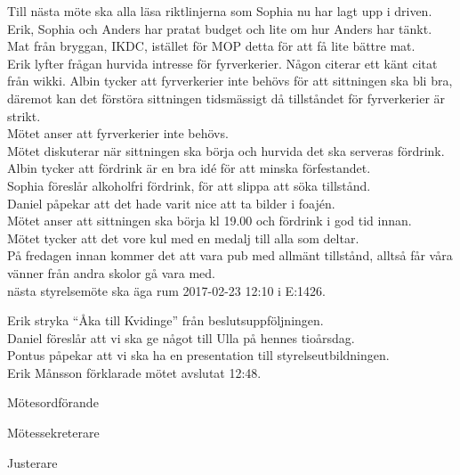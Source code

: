 \documentclass[10pt]{article}
\def\mo{Erik Månsson}
\def\ms{Johan Karlberg}
\def\ji{Markus Rahne}
\begin{document}
\begin{paragrafer}
Till nästa möte ska alla läsa riktlinjerna som Sophia nu har lagt upp i driven.
Erik, Sophia och Anders har pratat budget och lite om hur Anders har tänkt. Mat från bryggan, IKDC, istället för MOP detta för att få lite bättre mat.\\
Erik lyfter frågan hurvida intresse för fyrverkerier. Någon citerar ett känt citat från wikki. Albin tycker att fyrverkerier inte behövs för att sittningen ska bli bra, däremot kan det förstöra sittningen tidsmässigt då tillståndet för fyrverkerier är strikt.\\
Mötet anser att fyrverkerier inte behövs.\\
Mötet diskuterar när sittningen ska börja och hurvida det ska serveras fördrink.
Albin tycker att fördrink är en bra idé för att minska förfestandet.\\
Sophia föreslår alkoholfri fördrink, för att slippa att söka tillstånd.\\
Daniel påpekar att det hade varit nice att ta bilder i foajén.\\
Mötet anser att sittningen ska börja kl 19.00 och fördrink i god tid innan.\\
Mötet tycker att det vore kul med en medalj till alla som deltar.\\
På fredagen innan kommer det att vara pub med allmänt tillstånd, alltså får våra vänner från andra skolor gå vara med.\\
{\Mba}nästa styrelsemöte ska äga rum 2017-02-23 12:10 i E:1426.

Erik \ypa stryka ``Åka till Kvidinge'' från beslutsuppföljningen.\\
\Mbaby
{}
Daniel föreslår att vi ska ge något till Ulla på hennes tioårsdag.\\
Pontus påpekar att vi ska ha en presentation till styrelseutbildningen.\\
{\mo} förklarade mötet avslutat 12:48.

\end{paragrafer}

\newpage
\hidesignfoot
\begin{signatures}{3}
\signature{\mo}{Mötesordförande}
\signature{\ms}{Mötessekreterare}
\signature{\ji}{Justerare}
\end{signatures}
\end{document}

